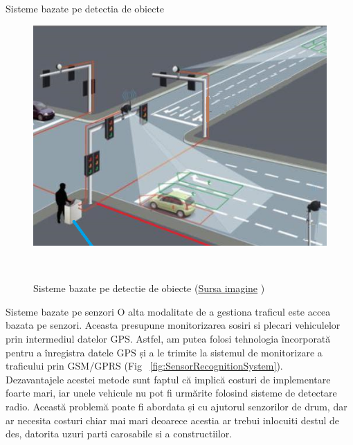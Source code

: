 \documentclass{beamer}
\begin{document}
    \begin{frame}{Sisteme bazate pe detectia de obiecte }
        \begin{figure}[h!]
            \includegraphics[width=(\textwidth / 4) * 3]{ObjectRecognitionSystemRepresentation.png}
            \caption{Sisteme bazate pe detectie de obiecte  
            (\href{https://english.mathrubhumi.com/news/kerala/knowing-traffic-camera-locations-isn-t-enough-to-escape-from-them-mvd-can-move-them-easily-1.7427787}{Sursa imagine} \textcopyright)}
            \label{fig:ObjectRecognitionSystem}
        \end{figure}

    \end{frame}

    \begin{frame}{Sisteme bazate pe senzori}
        O alta modalitate de a gestiona traficul este accea bazata pe senzori. 
        Aceasta presupune monitorizarea sosiri si plecari vehiculelor prin 
        intermediul datelor GPS.
        Astfel, am putea folosi tehnologia încorporată pentru a înregistra datele GPS și a le trimite
        la sistemul de monitorizare a traficului prin GSM/GPRS (Fig ~\ref{fig:SensorRecognitionSystem}). \\
        Dezavantajele acestei metode sunt faptul că implică costuri de implementare foarte mari, iar
        unele vehicule nu pot fi urmărite folosind sisteme de detectare radio.
        Această problemă poate fi abordata și cu ajutorul senzorilor de drum, dar ar necesita
        costuri chiar mai mari deoarece acestia ar trebui inlocuiti destul de des, 
        datorita uzuri parti carosabile si a constructiilor.
    \end{frame}
\end{document}

